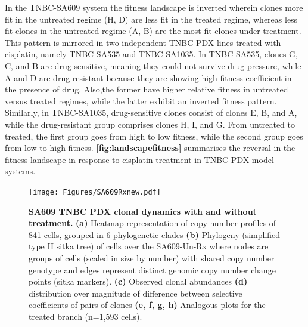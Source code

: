 In the TNBC-SA609 system the fitness landscape is inverted wherein
clones more fit in the untreated regime (H, D) are less fit in the treated regime, whereas less fit clones in the untreated regime (A, B) are the most fit clones under treatment. This pattern is
mirrored in two independent TNBC PDX lines treated with cisplatin, namely TNBC-SA535 and TNBC-SA1035. In TNBC-SA535, clones G, C, and B are drug-sensitive, meaning they could not survive drug pressure, while A and D are drug resistant because they are showing high fitness coefficient in the presence of drug. Also,the former have higher relative fitness in untreated versus treated regimes, while the latter exhibit an inverted fitness pattern. Similarly, in TNBC-SA1035, drug-sensitive clones consist of clones E, B, and A, while the drug-resistant group comprises clones H, I, and G. From untreated
to treated, the first group goes from high to low fitness, while the second group goes from low to high fitness. \textbf{\autoref{fig:landscapefitness}} summarises the reversal in the fitness landscape in response to cisplatin treatment in TNBC-PDX model systems.











\begin{figure}
\centering
\texttt{[image: Figures/SA609Rxnew.pdf]}
	
\caption[SA609 TNBC PDX clonal dynamics with and without treatment.]
	{\small
	\textbf{SA609 TNBC PDX clonal dynamics with and without treatment.}
	    \textbf{(a)} Heatmap representation of copy number profiles of 841 cells, grouped in 6 phylogenetic clades 
	    \textbf{(b)} Phylogeny (simplified type II sitka tree) of cells over the SA609-Un-Rx where nodes are groups of cells (scaled in size by number) with shared copy number genotype and edges represent distinct genomic copy number change points (sitka markers). \textbf{(c)} Observed clonal abundances \textbf{(d)} distribution over magnitude of difference between selective coefficients of pairs of clones \textbf{(e, f, g, h)} Analogous plots for the treated branch (n=1,593 cells).
	}
	\label{fig:SA609Rxnew}
\end{figure}


